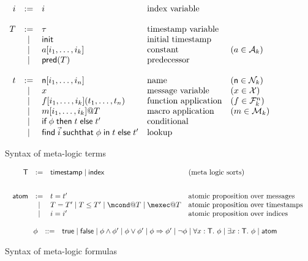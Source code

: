 \begin{figure}[t]
\[
  \begin{array}{rclll}
    i &:=& i & \text{index variable} & \\
    \\
    T &:=& \tau & \text{timestamp variable} & \\
      &\mid& \mathsf{init} & \text{initial timestamp} & \\
      &\mid& a[i_1,\ldots,i_k] & \text{constant} & (a\in\mathcal{A}_k) \\
      &\mid & \textsf{pred}(T) & \text{predecessor} & \\
    \\
    t & := & \mathsf{n}[i_1,\ldots,i_n] &\text{name} & (\mathsf{n}\in\mathcal{N}_k) \\
      & \mid & x  & \text{message variable} & (x\in\mathcal{X}) \\
      & \mid & f[i_1,\ldots,i_k](t_1,\dots,t_n) &\text{function application} & 
      (f\in\mathcal{F}_k^n)\\
      & \mid & m[i_1,\ldots,i_k]@T &\text{macro application} & (m\in\mathcal{M}_k)\\
      & \mid & \textsf{if}\; \phi \;\textsf{then}\; t \;\textsf{else}\; t'
        &\text{conditional} \\
      & \mid & \textsf{find}\; \vec{i} \;\textsf{suchthat}\; \phi \;\textsf{in}\; t \;\textsf{else}\; t'
        &\text{lookup}
  \end{array}
\]
\caption{Syntax of meta-logic terms}\label{fig:terms}
\end{figure}

\begin{figure}[t]
  \[
  \begin{array}{c}
   \begin{array}{rcll}
    \T &  := & \timestamp \mid \idx & \text{(meta logic sorts)} \\
    \\[2ex]
   \atom & := & t=t'
 & \text{atomic proposition over messages } \\
  &\mid & T=T' \mid T \leq T' \mid \mcond@T \mid \mexec@T &  \text{atomic proposition
  over timestamps } \\
  &\mid & i=i'  &  \text{atomic proposition
    over indices } \\
    \end{array}
\\
\\
     \begin{array}{rcll}
    \phi & ::= &  \true \mid \false \mid \phi \wedge \phi' \mid  \phi
    \vee \phi' \mid   \phi \Rightarrow \phi'\mid \neg \phi \mid
    \forall x : \T.\ \phi \mid \exists x:\T.\ \phi \mid \atom &
    \end{array}

\end{array}
    \]
    \caption{Syntax of meta-logic formulas}\label{fig:formulas}
\end{figure}

